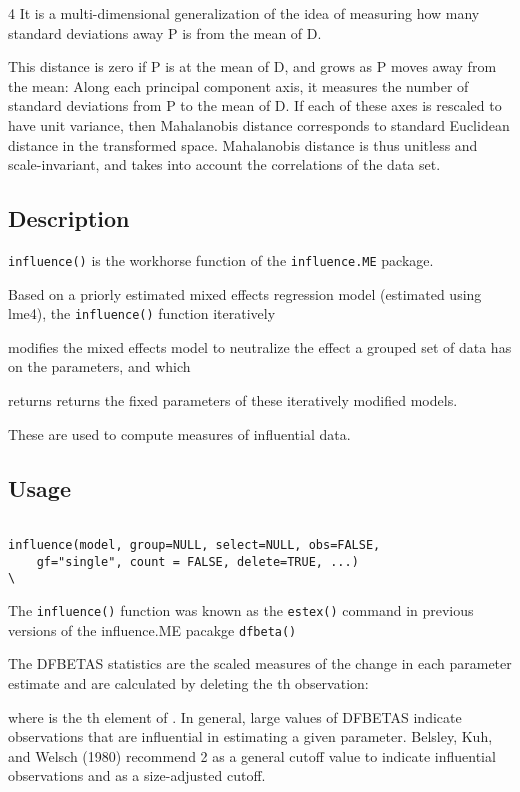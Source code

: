 4 It is a multi-dimensional generalization of the idea of measuring how many standard deviations away P is from the mean of D. 

This distance is zero if P is at the mean of D, and grows as P moves away from the mean: Along each principal component axis, it measures the 
number of standard deviations from P to the mean of D. If each of these axes is rescaled to have unit variance, then Mahalanobis distance corresponds to standard Euclidean distance in the transformed space. Mahalanobis distance is thus unitless and scale-invariant, and takes into account the correlations of the data set.

\subsection*{Description
}
\texttt{influence()} is the workhorse function of the \texttt{influence.ME} package. 


Based on a priorly estimated mixed effects regression model (estimated using lme4), the \texttt{influence()} function iteratively 

modifies the mixed effects model to neutralize the effect a grouped set of data has on the parameters, and which 

returns returns the fixed parameters of these iteratively modified models. 

These are used to compute measures of influential data.




\subsection*{Usage
}
\begin{framed}
\begin{verbatim}

influence(model, group=NULL, select=NULL, obs=FALSE, 
    gf="single", count = FALSE, delete=TRUE, ...)
\
\end{verbatim}
\end{framed}


The \texttt{influence()} function was known as the \texttt{estex()} command in previous versions of the influence.ME pacakge
\texttt{dfbeta()}


The DFBETAS statistics are the scaled measures of the change in each parameter estimate and are calculated by deleting the th observation:
 		 	 
where  is the th element of .
In general, large values of DFBETAS indicate observations that are influential in estimating a given parameter. Belsley, Kuh, and Welsch (1980) recommend 2 as a general cutoff value to indicate influential observations and  as a size-adjusted cutoff.


